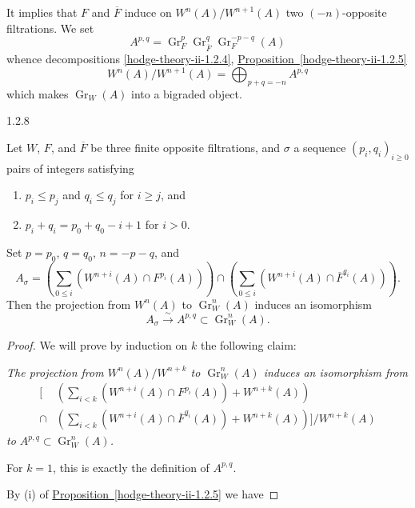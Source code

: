   It implies that \(F\) and \(\overline {F}\) induce on \(W^n(A)/W^{n+1}(A)\) two \((-n)\)-opposite filtrations.
  We set
  \[     A^{p,q}     = \operatorname {Gr}_F^p\operatorname {Gr}_{\overline {F}}^q\operatorname {Gr}_F^{-p-q}(A)   \]
  whence decompositions \cref{hodge-theory-ii-1.2.4}, \hyperref[hodge-theory-ii-1.2.5]{Proposition~\ref*{hodge-theory-ii-1.2.5}}
  \[     W^n(A)/W^{n+1}(A)     = \bigoplus _{p+q=-n} A^{p,q}   \tag{1.2.7.1}   \]
  which makes \(\operatorname {Gr}_W(A)\) into a bigraded object.\begin{lemma}{1.2.8}\label{hodge-theory-ii-1.2.8}\skipsinglepar\par{}Let \(W\), \(F\), and \(\overline {F}\) be three finite opposite filtrations, and \(\sigma \) a sequence \((p_i,q_i)_{i\geqslant 0}\) pairs of integers satisfying

    
 \begin{enumerate}
      
 \item[(a)]
        \(p_i\leqslant  p_j\) and \(q_i\leqslant  q_j\) for \(i\geqslant  j\), and
      

      
 \item[(b)]
        \(p_i+q_i=p_0+q_0-i+1\) for \(i>0\).
      

    \end{enumerate}


    Set \(p=p_0\), \(q=q_0\), \(n=-p-q\), and
    \[       A_\sigma        = \left ( \sum _{0\leqslant  i}(W^{n+i}(A)\cap  F^{p_i}(A)) \right )       \cap  \left ( \sum _{0\leqslant  i}(W^{n+i}(A)\cap \overline {F}^{q_i}(A)) \right ).     \]
    Then the projection from \(W^n(A)\) to \(\operatorname {Gr}_W^n(A)\) induces an isomorphism
    \[       A_\sigma        \xrightarrow {\sim } A^{p,q} \subset  \operatorname {Gr}_W^n(A).     \]\begin{proof}\par{}We will prove by induction on \(k\) the following claim:\par{}\emph{The projection from \(W^n(A)/W^{n+k}\) to \(\operatorname {Gr}_W^n(A)\) induces an isomorphism from
        \[           \begin {aligned}             \Bigg [             &\left ( \sum _{i<k} (W^{n+i}(A)\cap  F^{p_i}(A)) + W^{n+k}(A) \right )           \\\cap              &\left ( \sum _{i<k} (W^{n+i}(A)\cap \overline {F}^{q_i}(A)) + W^{n+k}(A) \right )             \Bigg ] / W^{n+k}(A)           \end {aligned}           \tag{$*_k$}         \]
        to \(A^{p,q}\subset \operatorname {Gr}_W^n(A)\).}\par{}For \(k=1\), this is exactly the definition of \(A^{p,q}\).\par{}By (i) of \hyperref[hodge-theory-ii-1.2.5]{Proposition~\ref*{hodge-theory-ii-1.2.5}} we have


\end{proof}
\end{lemma}

